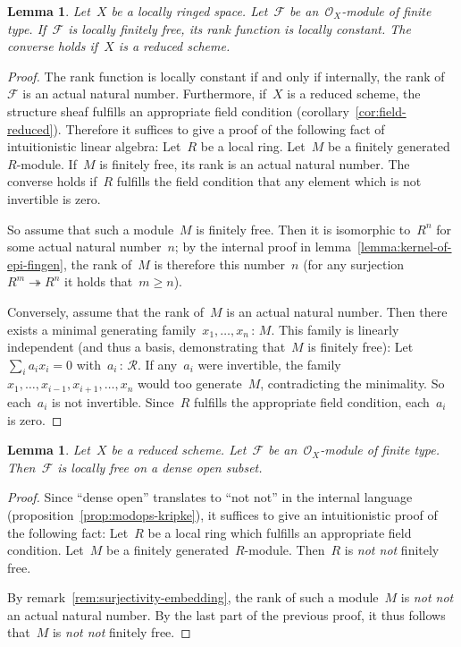 \documentclass[10pt]{amsart}
\theoremstyle{definition}
\theoremstyle{plain}
\newtheorem{lemma}[defn]{Lemma}
\theoremstyle{remark}
\newcommand{\F}{\mathcal{F}}
\renewcommand{\O}{\mathcal{O}}
\newcommand{\R}{\mathcal{R}}
\newcommand{\?}{\,{:}\,}
\renewcommand{\_}{\mathpunct{.}\,}
\newcommand{\notnot}{\emph{not not}\xspace}
\begin{document}
\begin{lemma}Let~$X$ be a locally ringed space. Let~$\F$ be an~$\O_X$-module of
finite type. If~$\F$ is locally finitely free, its rank function is locally
constant. The converse holds if~$X$ is a reduced scheme.
\end{lemma}
\begin{proof}The rank function is locally constant if and only if internally,
the rank of~$\F$ is an actual natural number. Furthermore, if~$X$ is a reduced
scheme, the structure sheaf fulfills an appropriate field condition
(corollary~\ref{cor:field-reduced}). Therefore it suffices to give a
proof of the following fact of intuitionistic linear algebra: Let~$R$ be a
local ring. Let~$M$ be a finitely generated~$R$-module. If~$M$ is finitely
free, its rank is an actual natural number. The converse holds if~$R$ fulfills
the field condition that any element which is not invertible is zero.

So assume that such a module~$M$ is finitely free. Then it is isomorphic
to~$R^n$ for some actual natural number~$n$; by the internal proof in
lemma~\ref{lemma:kernel-of-epi-fingen}, the rank of~$M$ is therefore this
number~$n$ (for any surjection~$R^m \twoheadrightarrow R^n$ it holds that~$m
\geq n$).

Conversely, assume that the rank of~$M$ is an actual natural number. Then
there exists a minimal generating family~$x_1,\ldots,x_n\?M$. This family is
linearly independent (and thus a basis, demonstrating that~$M$ is finitely
free): Let~$\sum_i a_i x_i = 0$ with~$a_i\?\R$. If any~$a_i$ were
invertible, the family~$x_1,\ldots,x_{i-1},x_{i+1},\ldots,x_n$ would too
generate~$M$, contradicting the minimality. So each~$a_i$ is not invertible.
Since~$R$ fulfills the appropriate field condition, each~$a_i$ is zero.
\end{proof}

\begin{lemma}Let~$X$ be a reduced scheme. Let~$\F$ be an~$\O_X$-module of
finite type. Then~$\F$ is locally free on a dense open subset.\end{lemma}
\begin{proof}Since ``dense open'' translates to ``not not'' in the internal
language (proposition~\ref{prop:modops-kripke}), it suffices to give an
intuitionistic proof of the following fact: Let~$R$ be a local ring which fulfills an
appropriate field condition. Let~$M$ be a finitely generated~$R$-module.
Then~$R$ is \notnot finitely free.

By remark~\ref{rem:surjectivity-embedding}, the rank of such a module~$M$ is
\notnot an actual natural number. By the last part of the
previous proof, it thus follows that~$M$ is \notnot finitely free.
\end{proof}
\end{document}
